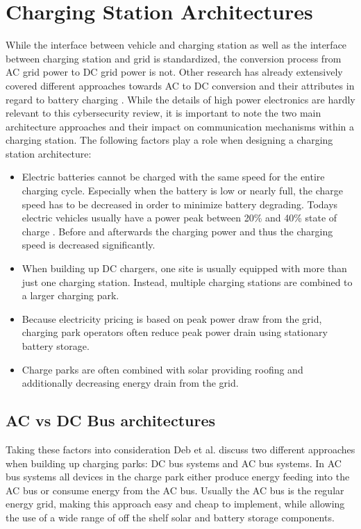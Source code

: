 \documentclass[conference,flushend]{iaria} %
\begin{document}
\section{Charging Station Architectures}
While the interface between vehicle and charging station as well as the interface between charging station and grid is standardized, the conversion process from AC grid power to DC grid power is not.
Other research has already extensively covered different approaches towards AC to DC conversion and their attributes in regard to battery charging \cite{tu_extreme_2019, das_electric_2020, deb_review_2021}.
While the details of high power electronics are hardly relevant to this cybersecurity review, it is important to note the two main architecture approaches and their impact on communication mechanisms within a charging station.
The following factors play a role when designing a charging station architecture:
\begin{itemize}
    \item Electric batteries cannot be charged with the same speed for the entire charging cycle.
    Especially when the battery is low or nearly full, the charge speed has to be decreased in order to minimize battery degrading.
    Todays electric vehicles usually have a power peak between 20\% and 40\% state of charge \cite{noauthor_audi_nodate}.
    Before and afterwards the charging power and thus the charging speed is decreased significantly.
    \item When building up DC chargers, one site is usually equipped with more than just one charging station. Instead, multiple charging stations are combined to a larger charging park.
    \item Because electricity pricing is based on peak power draw from the grid, charging park operators often reduce peak power drain using stationary battery storage.
    \item Charge parks are often combined with solar providing roofing and additionally decreasing energy drain from the grid.
\end{itemize}

\subsection{AC vs DC Bus architectures}
Taking these factors into consideration Deb et al. \cite{deb_review_2021} discuss two different approaches when building up charging parks: DC bus systems and AC bus systems.
In AC bus systems all devices in the charge park either produce energy feeding into the AC bus or consume energy from the AC bus.
Usually the AC bus is the regular energy grid, making this approach easy and cheap to implement, while allowing the use of a wide range of off the shelf solar and battery storage components.
\end{document}
